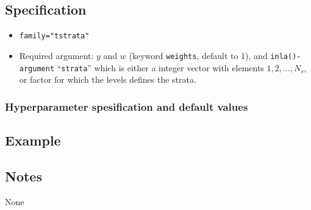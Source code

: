 \documentclass[a4paper,11pt]{article}
\begin{document}
\subsection*{Specification}

\begin{itemize}
\item \texttt{family="tstrata"}
\item Required argument: $y$ and $w$ (keyword {\tt weights}, default
    to 1), and \texttt{inla()-argument} ``\texttt{strata}'' which is
    either a integer vector with elements $1, 2, \ldots, N_{s}$, or
    factor for which the levels defines the strata.
\end{itemize}

\subsubsection*{Hyperparameter spesification and default values}


\subsection*{Example}



\subsection*{Notes}
None
\end{document}
